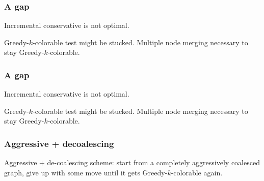 \begin{frame}[label=past]
  \frametitle{A gap}
  Incremental conservative is not optimal. 
  \begin{block}{}
  Greedy-$k$-colorable test might be stucked. Multiple node merging necessary to stay Greedy-$k$-colorable.
\end{block}
%

\end{frame}
%
\begin{frame}[label=past]
  \frametitle{A gap}
  Incremental conservative is not optimal. 
  \begin{block}{}
  Greedy-$k$-colorable test might be stucked. Multiple node merging necessary to stay Greedy-$k$-colorable.
\end{block}
{\vspace{2.5cm}}%
\end{frame}
%
\begin{frame}[label=past]
  \frametitle{Aggressive + decoalescing}
\begin{block}{}
\alert{Aggressive + de-coalescing} scheme: start from a completely aggressively coalesced graph, give up with some move until it gets Greedy-$k$-colorable again. 
\end{block}
  \vspace{2.5cm}
\end{frame}


